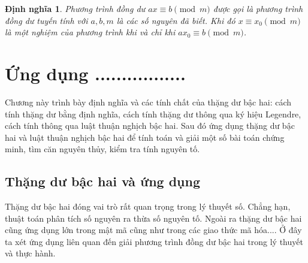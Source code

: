 \documentclass[12pt,a4paper,openany,oneside]{report}
\newtheorem{dn}[dl]{Định nghĩa}
\begin{document}
 \begin{dn} \rm Phương trình đồng dư $ax \equiv b \pmod{m}$ được gọi là {\it phương trình đồng dư tuyến tính} với $a, b, m$ là các số nguyên đã biết. Khi đó $x\equiv x_0\pmod m$ là một nghiệm của phương trình khi và chỉ khi $ax_0 \equiv b\pmod{m}$.
\end{dn}





\chapter{Ứng dụng .................}

Chương này trình bày định nghĩa và các tính chất của thặng dư bậc hai: cách tính thặng dư bằng định nghĩa, cách tính thặng dư thông qua ký hiệu Legendre, cách tính thông qua luật thuận nghịch bậc hai. Sau đó ứng dụng thặng dư bậc hai và luật thuận nghịch bậc hai để tính toán và giải một số bài toán chứng minh, tìm căn nguyên thủy, kiểm tra tính nguyên tố.  

\section{Thặng dư bậc hai và ứng dụng}
Thặng dư bậc hai đóng vai trò rất quan trọng trong lý thuyết số. Chẳng hạn, thuật toán phân tích số nguyên ra thừa số nguyên tố. Ngoài ra thặng dư bậc hai cũng ứng dụng lớn trong mật mã cũng như trong các giao thức mã hóa.... Ở đây ta xét ứng dụng liên quan đến giải phương trình đồng dư bậc hai trong lý thuyết và thực hành.
 
\end{document}
